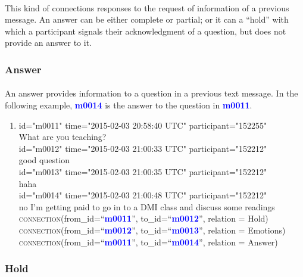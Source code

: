 \documentclass{article}
\begin{document}
\paragraph{}
This kind of connections responses to the request of information of a previous message. An answer can be either complete or partial; or it can a ``hold'' with which a participant signals their acknowledgment of a question, but does not provide an answer to it.

\subsubsection{Answer}
\paragraph{}
An answer provides information to a question in a previous text message. In the following example, \textbf{\textcolor{blue}{m0014}} is the answer to the question in \textbf{\textcolor{blue}{m0011}}.

\begin{enumerate}[resume]
\item
id="m0011" time="2015-02-03 20:58:40 UTC" participant="152255"\\
What are you teaching? \\
id="m0012" time="2015-02-03 21:00:33 UTC" participant="152212"\\
good question\\
id="m0013" time="2015-02-03 21:00:35 UTC" participant="152212"\\
haha\\
id="m0014" time="2015-02-03 21:00:48 UTC" participant="152212"\\
no I’m getting paid to go in to a DMI class and discuss some readings\\
\textsc{connection}(from\_id=``\textbf{\textcolor{blue}{m0011}}'', to\_id=``\textbf{\textcolor{blue}{m0012}}'', relation = Hold)\\
\textsc{connection}(from\_id=``\textbf{\textcolor{blue}{m0012}}'', to\_id=``\textbf{\textcolor{blue}{m0013}}'', relation = Emotions)\\
\textsc{connection}(from\_id=``\textbf{\textcolor{blue}{m0011}}'', to\_id=``\textbf{\textcolor{blue}{m0014}}'', relation = Answer)\\
\end{enumerate}

\subsubsection{Hold}
\end{document}
